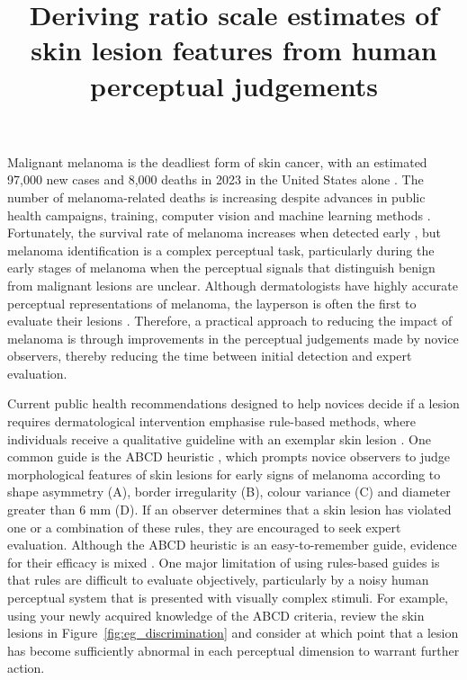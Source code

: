 \documentclass[
    man, 12pt, a4paper,
    donotrepeattitle, floatsintext, draftfirst
]{apa7}
\title{Deriving ratio scale estimates of skin lesion features from human perceptual judgements}
\begin{document}
    \maketitle \noindent
Malignant melanoma is the deadliest form of skin cancer, with an estimated 97,000 new cases and 8,000 deaths in 2023 in the United States alone \parencite{siegel2023cancer}. The number of melanoma-related deaths is increasing despite advances in public health campaigns, training, computer vision and machine learning methods \parencite{glazer2017analysis, svedman2016stage, rigel2010trends, gardner2019current}. Fortunately, the survival rate of melanoma increases when detected early \parencite{davis2019current, rigel2010evolution}, but melanoma identification is a complex perceptual task, particularly during the early stages of melanoma when the perceptual signals that distinguish benign from malignant lesions are unclear. Although dermatologists have highly accurate perceptual representations of melanoma, the layperson is often the first to evaluate their lesions \parencite{koh1992discovers}. Therefore, a practical approach to reducing the impact of melanoma is through improvements in the perceptual judgements made by novice observers, thereby reducing the time between initial detection and expert evaluation.

Current public health recommendations designed to help novices decide if a lesion requires dermatological intervention emphasise rule-based methods, where individuals receive a qualitative guideline with an exemplar skin lesion \parencite{branstrom2002laypersons, robinson2006skills}.
One common guide is the ABCD heuristic \parencite{abbasi2004early}, which prompts novice observers to judge morphological features of skin lesions for early signs of melanoma according to shape asymmetry (A), border irregularity (B), colour variance (C) and diameter greater than 6 mm (D).
If an observer determines that a skin lesion has violated one or a combination of these rules, they are encouraged to seek expert evaluation.
Although the ABCD heuristic is an easy-to-remember guide, evidence for their efficacy is mixed \parencite{branstrom2002laypersons, xu2016training}. One major limitation of using rules-based guides is that rules are difficult to evaluate objectively, particularly by a noisy human perceptual system that is presented with visually complex stimuli.
For example, using your newly acquired knowledge of the ABCD criteria, review the skin lesions in Figure~\ref{fig:eg_discrimination} and consider at which point that a lesion has become sufficiently abnormal in each perceptual dimension to warrant further action.
\end{document}
